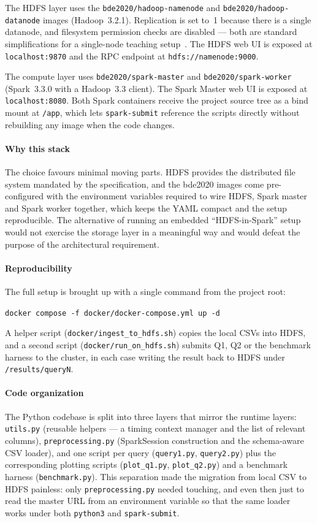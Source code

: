 \documentclass[conference]{IEEEtran}
\begin{document}
The HDFS layer uses the
\texttt{bde2020/hadoop-namenode} and
\texttt{bde2020/hadoop-datanode} images (Hadoop~3.2.1).
Replication is set to~1 because there is a single datanode, and
filesystem permission checks are disabled --- both are standard
simplifications for a single-node teaching setup~\cite{bde2020}.
The HDFS web UI is exposed at \texttt{localhost:9870} and the
RPC endpoint at \texttt{hdfs://namenode:9000}.

The compute layer uses \texttt{bde2020/spark-master} and
\texttt{bde2020/spark-worker} (Spark~3.3.0 with a Hadoop~3.3
client). The Spark Master web UI is exposed at
\texttt{localhost:8080}. Both Spark containers receive the
project source tree as a bind mount at \texttt{/app}, which lets
\texttt{spark-submit} reference the scripts directly without
rebuilding any image when the code changes.

\paragraph{Why this stack}
The choice favours minimal moving parts. HDFS provides the
distributed file system mandated by the specification, and the
bde2020 images come pre-configured with the environment variables
required to wire HDFS, Spark master and Spark worker together,
which keeps the YAML compact and the setup reproducible. The
alternative of running an embedded ``HDFS-in-Spark'' setup would
not exercise the storage layer in a meaningful way and would
defeat the purpose of the architectural requirement.

\paragraph{Reproducibility}
The full setup is brought up with a single command from the
project root:
\begin{center}
\texttt{docker compose -f docker/docker-compose.yml up -d}
\end{center}
A helper script (\texttt{docker/ingest\_to\_hdfs.sh}) copies the
local CSVs into HDFS, and a second script
(\texttt{docker/run\_on\_hdfs.sh}) submits Q1, Q2 or the
benchmark harness to the cluster, in each case writing the result
back to HDFS under \texttt{/results/queryN}.

\paragraph{Code organization}
The Python codebase is split into three layers that mirror the
runtime layers: \texttt{utils.py} (reusable helpers --- a timing
context manager and the list of relevant columns),
\texttt{preprocessing.py} (SparkSession construction and the
schema-aware CSV loader), and one script per query
(\texttt{query1.py}, \texttt{query2.py}) plus the corresponding
plotting scripts (\texttt{plot\_q1.py}, \texttt{plot\_q2.py}) and
a benchmark harness (\texttt{benchmark.py}). This separation made
the migration from local CSV to HDFS painless: only
\texttt{preprocessing.py} needed touching, and even then just to
read the master URL from an environment variable so that the same
loader works under both \texttt{python3} and \texttt{spark-submit}.
\end{document}
